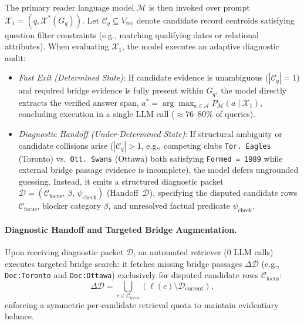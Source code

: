 \documentclass[runningheads]{llncs}
\begin{document}
\enlargethispage{4.5\baselineskip}
The primary reader language model $\mathcal{M}$ is then invoked over prompt $\mathcal{X}_1 = (q, \mathcal{X}^*(G_q))$. Let $\mathcal{C}_q \subseteq V_{\text{rec}}$ denote candidate record centroids satisfying question filter constraints (e.g., matching qualifying dates or relational attributes). When evaluating $\mathcal{X}_1$, the model executes an adaptive diagnostic audit:
\begin{itemize}[leftmargin=1.5em]
    \item \emph{Fast Exit (Determined State)}: If candidate evidence is unambiguous ($|\mathcal{C}_q| = 1$) and required bridge evidence is fully present within $G_q$, the model directly extracts the verified answer span, $a^* = \arg\max_{a \in \mathcal{A}} P_{\mathcal{M}}(a \mid \mathcal{X}_1)$, concluding execution in a single LLM call ($\approx 76\text{--}80\%$ of queries).
    \item \emph{Diagnostic Handoff (Under-Determined State)}: If structural ambiguity or candidate collisions arise ($|\mathcal{C}_q| > 1$, e.g., competing clubs \texttt{Tor. Eagles} (Toronto) vs.\ \texttt{Ott. Swans} (Ottawa) both satisfying \texttt{Formed = 1989} while external bridge passage evidence is incomplete), the model defers ungrounded guessing. Instead, it emits a structured diagnostic packet $\mathcal{D} = (\mathcal{C}_{\text{focus}}, \, \beta, \, \psi_{\text{check}})$ (Handoff~$\mathcal{D}$), specifying the disputed candidate rows $\mathcal{C}_{\text{focus}}$, blocker category $\beta$, and unresolved factual predicate $\psi_{\text{check}}$.
\end{itemize}

\paragraph{Diagnostic Handoff and Targeted Bridge Augmentation.}
Upon receiving diagnostic packet $\mathcal{D}$, an automated retriever (0 LLM calls) executes targeted bridge search: it fetches missing bridge passages $\Delta\mathcal{D}$ (e.g., \texttt{Doc:Toronto} and \texttt{Doc:Ottawa}) exclusively for disputed candidate rows $\mathcal{C}_{\text{focus}}$:
\begin{equation}
\label{eq:targeted-retrieval}
\Delta \mathcal{D} = \bigcup_{c \in \mathcal{C}_{\text{focus}}} \left( \ell(c) \setminus \mathcal{D}_{\text{current}} \right),
\end{equation}
enforcing a symmetric per-candidate retrieval quota to maintain evidentiary balance.
\end{document}
